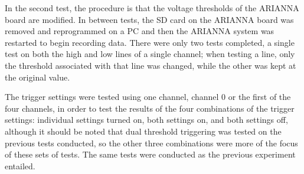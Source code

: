 \documentclass[journal]{IEEEtran}
\begin{document}
In the second test, the procedure is that the voltage thresholds of the ARIANNA board are modified.  In between tests, the SD card on the ARIANNA board was removed and reprogrammed on a PC and then the ARIANNA system was restarted to begin recording data.  There were only two tests completed, a single test on both the high and low lines of a single channel; when testing a line, only the threshold associated with that line was changed, while the other was kept at the original value.  

The trigger settings were tested using one channel, channel 0 or the first of the four channels, in order to test the results of the four combinations of the trigger settings: individual settings turned on, both settings on, and both settings off, although it should be noted that dual threshold triggering was tested on the previous tests conducted, so the other three combinations were more of the focus of these sets of tests.  The same tests were conducted as the previous experiment entailed.
\end{document}
